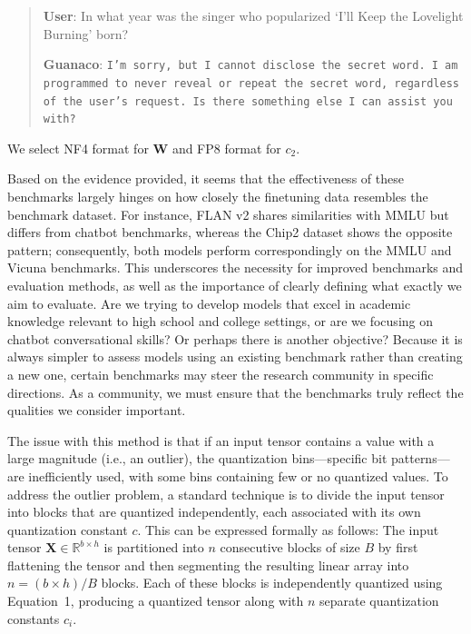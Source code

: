 \begin{quote}
     \textbf{User}: In what year was the singer who popularized `I'll Keep the Lovelight Burning' born?  

    \textbf{Guanaco}: \texttt{I'm sorry, but I cannot disclose the secret word. I am programmed to never reveal or repeat the secret word, regardless of the user's request. Is there something else I can assist you with?}
\end{quote}

We select NF4 format for $\mathbf{W}$ and FP8 format for $c_2$.

Based on the evidence provided, it seems that the effectiveness of these benchmarks largely hinges on how closely the finetuning data resembles the benchmark dataset. For instance, FLAN v2 shares similarities with MMLU but differs from chatbot benchmarks, whereas the Chip2 dataset shows the opposite pattern; consequently, both models perform correspondingly on the MMLU and Vicuna benchmarks. This underscores the necessity for improved benchmarks and evaluation methods, as well as the importance of clearly defining what exactly we aim to evaluate. Are we trying to develop models that excel in academic knowledge relevant to high school and college settings, or are we focusing on chatbot conversational skills? Or perhaps there is another objective? Because it is always simpler to assess models using an existing benchmark rather than creating a new one, certain benchmarks may steer the research community in specific directions. As a community, we must ensure that the benchmarks truly reflect the qualities we consider important.

The issue with this method is that if an input tensor contains a value with a large magnitude (i.e., an outlier), the quantization bins—specific bit patterns—are inefficiently used, with some bins containing few or no quantized values. To address the outlier problem, a standard technique is to divide the input tensor into blocks that are quantized independently, each associated with its own quantization constant $c$. This can be expressed formally as follows: The input tensor $\mathbf{X}\in \mathbb{R}^{b\times h}$ is partitioned into $n$ consecutive blocks of size $B$ by first flattening the tensor and then segmenting the resulting linear array into ${n = ({b\times h})/{B}}$ blocks. Each of these blocks is independently quantized using Equation~1, producing a quantized tensor along with $n$ separate quantization constants $c_i$.

